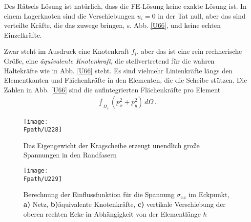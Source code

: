 {{Des R\"{a}tsels L\"{o}sung ist nat\"{u}rlich, dass die FE-L\"{o}sung keine exakte L\"{o}sung ist. In einem Lagerknoten sind die Verschiebungen $u_i = 0$ in der Tat null, aber das sind verteilte Kr\"{a}fte, die das zuwege bringen, s. Abb. \ref{U66}, und keine echten Einzelkr\"{a}fte.

Zwar steht im Ausdruck eine Knotenkraft $f_i$, aber das ist eine rein rechnerische Gr\"{o}{\ss}e, eine {\em \"{a}quivalente Knotenkraft\/}, die stellvertretend f\"{u}r die wahren Haltekr\"{a}fte wie in Abb. \ref{U66} steht. Es sind vielmehr Linienkr\"{a}fte l\"{a}ngs den Elementkanten und Fl\"{a}chenkr\"{a}fte in den Elementen, die die Scheibe st\"{u}tzen. Die Zahlen in Abb. \ref{U66} sind die aufintegrierten Fl\"{a}chenkr\"{a}fte pro Element
\begin{align}\label{Eq63}
\int_{\Omega_e} (p_x^2 + p_y^2)\,d\Omega\,.
\end{align}

\begin{figure}
\centering
\texttt{[image: \\Fpath/U228]}
\caption{Das Eigengewicht der Kragscheibe erzeugt unendlich gro{\ss}e Spannungen in den Randfasern}
\label{U228}%
\end{figure}%

\begin{figure}
\centering
\texttt{[image: \\Fpath/U229]}
\caption{Berechnung der Einflussfunktion f\"{u}r die Spannung $\sigma_{xx}$ im Eckpunkt,
  \textbf{ a)} Netz,  \textbf{ b)}\"{a}quivalente Knotenkr\"{a}fte, \textbf{ c)} vertikale Verschiebung der oberen rechten Ecke in Abh\"{a}ngigkeit von der Elementl\"{a}nge $h$}
\label{U229}%
\end{figure}%

}}
